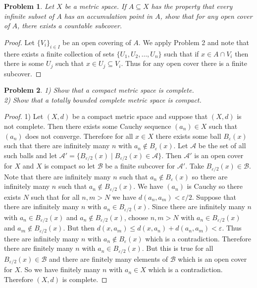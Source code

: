 \documentclass{article}
\newtheorem{problem}{Problem}
\begin{document}
\begin{flushleft}
\begin{problem}
Let $X$ be a metric space. If $A \subseteq X$ has the property that every infinite subset of $A$ has an accumulation point in $A$, show that for any open cover of $A$, there exists a countable subcover.
\end{problem}
\begin{proof}
Let $\{V_i\}_{i \in I}$ be an open covering of $A$. We apply Problem 2 and note that there exists a finite collection of sets $\{U_1, U_2, \dots , U_n\}$ such that if $x \in A \cap V_i$ then there is some $U_j$ such that $x \in U_j \subseteq V_i$. Thus for any open cover there is a finite subcover.
\end{proof}

\begin{problem}
1) Show that a compact metric space is complete.\\
2) Show that a totally bounded complete metric space is compact.
\end{problem}
\begin{proof}
1) Let $(X,d)$ be a compact metric space and suppose that $(X,d)$ is not complete. Then there exists some Cauchy sequence $(a_n) \in X$ such that $(a_n)$ does not converge. Therefore for all $x \in X$ there exists some ball $B_{\varepsilon}(x)$ such that there are infinitely many $n$ with $a_n \notin B_{\varepsilon}(x)$. Let $\mathcal{A}$ be the set of all such balls and let $\mathcal{A}' = \{B_{\varepsilon/2}(x) \mid B_{\varepsilon/2}(x) \in \mathcal{A}\}$. Then $\mathcal{A}'$ is an open cover for $X$ and $X$ is compact so let $\mathcal{B}$ be a finite subcover for $\mathcal{A}'$. Take $B_{\varepsilon/2}(x) \in \mathcal{B}$. Note that there are infinitely many $n$ such that $a_n \notin B_{\varepsilon}(x)$ so there are infinitely many $n$ such that $a_n \notin B_{\varepsilon/2}(x)$. We have $(a_n)$ is Cauchy so there exists $N$ such that for all $n,m > N$ we have $d(a_n,a_m) < \varepsilon/2$. Suppose that there are infinitely many $n$ with $a_n \in B_{\varepsilon/2}(x)$. Since there are infinitely many $n$ with $a_n \in B_{\varepsilon/2}(x)$ and $a_n \notin B_{\varepsilon/2}(x)$, choose $n,m>N$ with $a_n \in B_{\varepsilon/2}(x)$ and $a_m \notin B_{\varepsilon/2}(x)$. But then $d(x,a_m) \leq d(x,a_n) + d(a_n,a_m) < \varepsilon$. Thus there are infinitely many $n$ with $a_n \notin B_{\varepsilon}(x)$ which is a contradiction. Therefore there are finitely many $n$ with $a_n \in B_{\varepsilon/2}(x)$. But this is true for all $B_{\varepsilon/2}(x) \in \mathcal{B}$ and there are finitely many elements of $\mathcal{B}$ which is an open cover for $X$. So we have finitely many $n$ with $a_n \in X$ which is a contradiction. Therefore $(X,d)$ is complete.\newline


\end{proof}
\end{flushleft}
\end{document}
